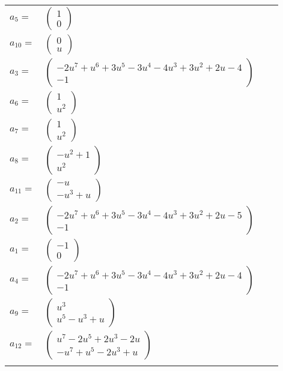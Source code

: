 \documentclass[1p]{elsarticle_modified}
\theoremstyle{definition}
\begin{document}
\begin{tabular}{m{7pt} m{180pt} m{7pt} m{180pt} }
\flushright $a_{5}=$&$\begin{pmatrix}1\\0\end{pmatrix}$ \\
\flushright $a_{10}=$&$\begin{pmatrix}0\\u\end{pmatrix}$ \\
\flushright $a_{3}=$&$\begin{pmatrix}-2 u^7+u^6+3 u^5-3 u^4-4 u^3+3 u^2+2 u-4\\-1\end{pmatrix}$ \\
\flushright $a_{6}=$&$\begin{pmatrix}1\\u^2\end{pmatrix}$ \\
\flushright $a_{7}=$&$\begin{pmatrix}1\\u^2\end{pmatrix}$ \\
\flushright $a_{8}=$&$\begin{pmatrix}- u^2+1\\u^2\end{pmatrix}$ \\
\flushright $a_{11}=$&$\begin{pmatrix}- u\\- u^3+u\end{pmatrix}$ \\
\flushright $a_{2}=$&$\begin{pmatrix}-2 u^7+u^6+3 u^5-3 u^4-4 u^3+3 u^2+2 u-5\\-1\end{pmatrix}$ \\
\flushright $a_{1}=$&$\begin{pmatrix}-1\\0\end{pmatrix}$ \\
\flushright $a_{4}=$&$\begin{pmatrix}-2 u^7+u^6+3 u^5-3 u^4-4 u^3+3 u^2+2 u-4\\-1\end{pmatrix}$ \\
\flushright $a_{9}=$&$\begin{pmatrix}u^3\\u^5- u^3+u\end{pmatrix}$ \\
\flushright $a_{12}=$&$\begin{pmatrix}u^7-2 u^5+2 u^3-2 u\\- u^7+u^5-2 u^3+u\end{pmatrix}$\\&\end{tabular}
\end{document}
